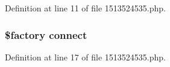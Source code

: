 Definition at line 11 of file 1513524535.\+php.

\subsubsection[{\texorpdfstring{connect}{connect}}]{\setlength{\rightskip}{0pt plus 5cm}\$factory connect}\hypertarget{1513524535_8php_a3fdbedd7713e458f25fcf7dc1f562a3d}{}\label{1513524535_8php_a3fdbedd7713e458f25fcf7dc1f562a3d}


Definition at line 17 of file 1513524535.\+php.

